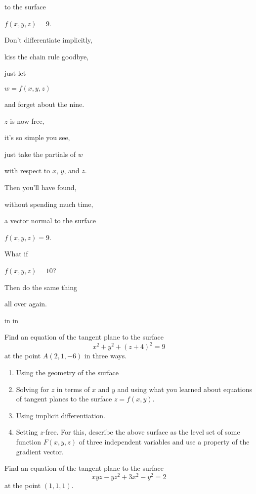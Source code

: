 \documentclass{ximera}
\newcommand{\pskip}{\vskip 0.1 in}
\begin{document}
to the surface

$f(x,y,z)=9$.

Don't differentiate implicitly,

kiss the chain rule goodbye,

just let 

$w=f(x,y,z)$

and forget about the nine.

$z$ is now free,

it's so simple you see,

just take the partials of $w$

with respect to $x$, $y$, and $z$.

Then you'll have found,

without spending much time,

a vector normal to the surface

$f(x,y,z) = 9$.

What if 

$f(x,y,z) = 10$?

Then do the same thing

all over again.


\pskip\pskip


\begin{question} \label{Q356t65yhtrt}
Find an equation of the tangent plane to the surface
\[
       x^2 + y^2 + (z+4)^2 = 9
\]
at the point $A(2,1,-6)$ in three ways.

\begin{enumerate}
\item Using the geometry of the surface

\item Solving for $z$ in terms of $x$ and $y$ and using what you learned about equations of tangent planes to the surface $z=f(x,y)$.

\item Using implicit differentiation.

\item Setting $z$-free. For this, describe the above surface as the level set of some function $F(x,y,z)$ of three independent variables and use a property of the gradient vector. 
\end{enumerate}
\end{question}

\begin{question} \label{Qdfbtt44}
Find an equation of the tangent plane to the surface
\[
    xyz - yz^2 +3x^2 -y^2 = 2
\]
at the point $(1,1,1)$.
\end{question}
\end{document}
